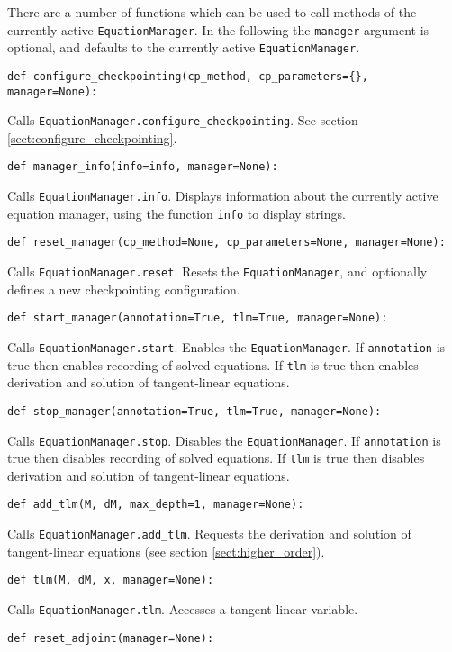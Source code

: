 \documentclass[11pt]{article}
\begin{document}
There are a number of functions which can be used to call methods of the
currently active \texttt{EquationManager}. In the following the
\texttt{manager} argument is optional, and defaults to the currently active
\texttt{EquationManager}.
\begin{lstlisting}
def configure_checkpointing(cp_method, cp_parameters={}, manager=None):
\end{lstlisting}
Calls \texttt{EquationManager.configure\_checkpointing}. See section
\ref{sect:configure_checkpointing}.
\begin{lstlisting}
def manager_info(info=info, manager=None):
\end{lstlisting}
Calls \texttt{EquationManager.info}. Displays information about the currently
active equation manager, using the function \texttt{info} to display strings.
\begin{lstlisting}
def reset_manager(cp_method=None, cp_parameters=None, manager=None):
\end{lstlisting}
Calls \texttt{EquationManager.reset}. Resets the \texttt{EquationManager}, and
optionally defines a new checkpointing configuration.
\begin{lstlisting}
def start_manager(annotation=True, tlm=True, manager=None):
\end{lstlisting}
Calls \texttt{EquationManager.start}. Enables the \texttt{EquationManager}. If
\texttt{annotation} is true then enables recording of solved equations. If
\texttt{tlm} is true then enables derivation and solution of tangent-linear
equations.
\begin{lstlisting}
def stop_manager(annotation=True, tlm=True, manager=None):
\end{lstlisting}
Calls \texttt{EquationManager.stop}. Disables the \texttt{EquationManager}. If
\texttt{annotation} is true then disables recording of solved equations. If
\texttt{tlm} is true then disables derivation and solution of tangent-linear
equations.
\begin{lstlisting}
def add_tlm(M, dM, max_depth=1, manager=None):
\end{lstlisting}
Calls \texttt{EquationManager.add\_tlm}. Requests the derivation and solution
of tangent-linear equations (see section \ref{sect:higher_order}).
\begin{lstlisting}
def tlm(M, dM, x, manager=None):
\end{lstlisting}
Calls \texttt{EquationManager.tlm}. Accesses a tangent-linear variable.
\begin{lstlisting}
def reset_adjoint(manager=None):
\end{lstlisting}
\end{document}
